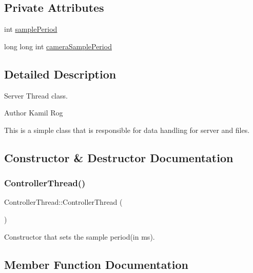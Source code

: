 \subsection*{Private Attributes}
\begin{DoxyCompactItemize}
\item 
int \hyperlink{classControllerThread_a5dcd0069c7d31295c7e1e598c31fadf7}{sample\+Period}
\item 
long long int \hyperlink{classControllerThread_acc0d9519e838a1b508c2f2f9274a109f}{camera\+Sample\+Period}
\end{DoxyCompactItemize}


\subsection{Detailed Description}
Server Thread class. 

\begin{DoxyAuthor}{Author}
Kamil Rog
\end{DoxyAuthor}
This is a simple class that is responsible for data handling for server and files. 

\subsection{Constructor \& Destructor Documentation}
\mbox{\label{classControllerThread_a00cd6502504f5f1e680e6be3f60a987d}} 
\subsubsection{\texorpdfstring{Controller\+Thread()}{ControllerThread()}}
{\footnotesize\ttfamily Controller\+Thread\+::\+Controller\+Thread (\begin{DoxyParamCaption}{ }\end{DoxyParamCaption})\hspace{0.3cm}{\ttfamily [inline]}}

Constructor that sets the sample period(in ms). 

\subsection{Member Function Documentation}
\mbox{\label{classCppThread_a8ff0fda6b913cc53764caef0e1200f3f}} 
